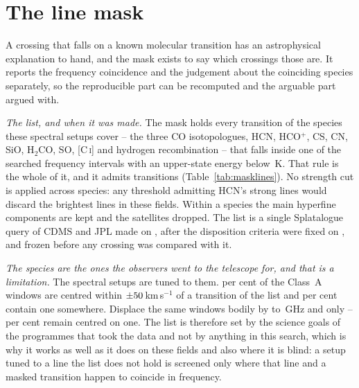 \section{The line mask}
\label{app:linemask}

A crossing that falls on a known molecular transition has an astrophysical
explanation to hand, and the mask exists to say which crossings those are. It
reports the frequency coincidence and the judgement about the coinciding
species separately, so the reproducible part can be recomputed and the
arguable part argued with.

\emph{The list, and when it was made.} The mask holds every transition of the
\FrNSpec{} species these spectral setups cover -- the three CO isotopologues,
HCN, HCO$^{+}$, CS, CN, SiO, H$_2$CO, SO, [C\,\textsc{i}] and hydrogen
recombination -- that falls inside one of the \McNIsland{} searched frequency
intervals with an upper-state energy below \McEuMax\,K. That rule is the whole
of it, and it admits \FrNTrans{} transitions (Table~\ref{tab:masklines}).
No strength cut is applied across species: any threshold admitting HCN's
strong lines would discard the brightest lines in these fields. Within a
species the main hyperfine components are kept and the satellites
dropped. The list is a single Splatalogue query of CDMS and
JPL \citep{Pickett1998,CDMS2005} made on \MkListDate{}, after the disposition
criteria were fixed on \MkCritDate, and frozen before any crossing was
compared with it.

\emph{The species are the ones the observers went to the telescope for, and
that is a limitation.} The spectral setups are tuned to them. \TnCenPct{} per
cent of the \NWinA{} Class~A windows are centred within
$\pm50$\,km\,s$^{-1}$ of a transition of the list and \TnWinPct{}
per cent contain one somewhere. Displace the same windows bodily by
\TnShiftLoGHz{} to \TnShiftHiGHz\,GHz and only
\TnCtrlCenLo--\TnCtrlCenHi{} per cent remain centred on one. The list is
therefore set by the science goals of the
programmes that took the data and not by anything in this search, which is
why it works as well as it does on these fields and also where it is blind: a
setup tuned to a line the list does not hold is screened only where that line
and a masked transition happen to coincide in frequency.

